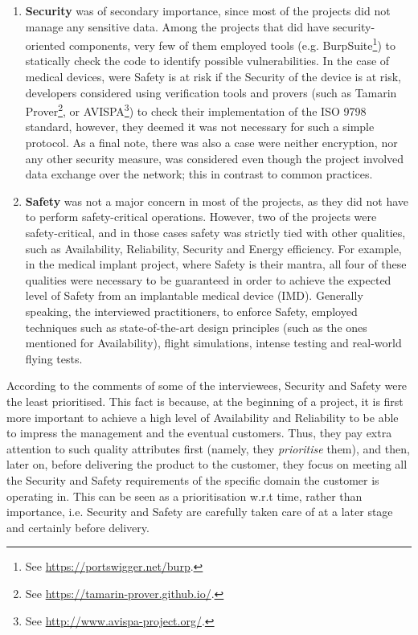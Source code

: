 \begin{itemize}
\begin{enumerate}[label=\alph*)]
        \item \textbf{Security} was of secondary importance, since most of the projects did not manage any sensitive data.
        Among the projects that did have security-oriented components, very few of them employed tools (e.g. BurpSuite\footnote{See \url{https://portswigger.net/burp}.}) to statically check the code to identify possible vulnerabilities.
        In the case of medical devices, were Safety is at risk if the Security of the device is at risk, developers considered using verification tools and provers (such as Tamarin Prover\footnote{See \url{https://tamarin-prover.github.io/}.}, or AVISPA\footnote{See \url{http://www.avispa-project.org/}.}) to check their implementation of the ISO 9798 standard, however, they deemed it was not necessary for such a simple protocol.
        As a final note, there was also a case were neither encryption, nor any other security measure, was considered even though the project involved data exchange over the network; this in contrast to common practices.

        \item \textbf{Safety} was not a major concern in most of the projects, as they did not have to perform safety-critical operations.
        However, two of the projects were safety-critical, and in those cases safety was strictly tied with other qualities, such as Availability, Reliability, Security and Energy efficiency.
        For example, in the medical implant project, where Safety is their mantra, all four of these qualities were necessary to be guaranteed in order to achieve the expected level of Safety from an implantable medical device (IMD).
        Generally speaking, the interviewed practitioners, to enforce Safety, employed techniques such as state-of-the-art design principles (such as the ones mentioned for Availability), flight simulations, intense testing and real-world flying tests. 
        
    \end{enumerate}
    According to the comments of some of the interviewees, Security and Safety were the least prioritised. This fact is because, at the beginning of a project, it is first more important to achieve a high level of Availability and Reliability to be able to impress the management and the eventual customers. Thus, they pay extra attention to such quality attributes first (namely, they \textit{prioritise} them), and then, later on, before delivering the product to the customer, they focus on meeting all the Security and Safety requirements of the specific domain the customer is operating in.
    This can be seen as a prioritisation w.r.t time, rather than importance, i.e. Security and Safety are carefully taken care of at a later stage and certainly before delivery.


\end{itemize}
